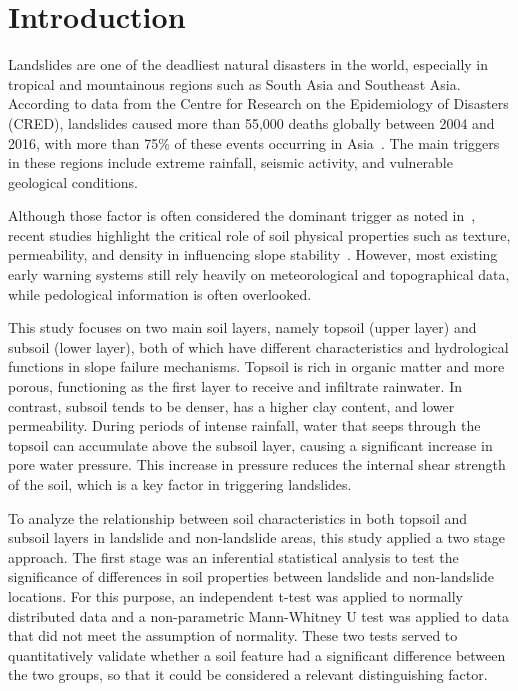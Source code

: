\section{Introduction}

Landslides are one of the deadliest natural disasters in the world, especially in tropical and mountainous regions such as South Asia and Southeast Asia. According to data from the Centre for Research on the Epidemiology of Disasters (CRED), landslides caused more than 55,000 deaths globally between 2004 and 2016, with more than 75\% of these events occurring in Asia~\cite{intro01}. 
The main triggers in these regions include extreme rainfall, seismic activity, and vulnerable geological conditions. 

Although those factor is often considered the dominant trigger as noted in~\cite{intro02}, recent studies highlight the critical role of soil physical properties such as texture, permeability, and density in influencing slope stability~\cite{intro03}. 
However, most existing early warning systems still rely heavily on meteorological and topographical data, while pedological information is often overlooked.

This study focuses on two main soil layers, namely topsoil (upper layer) and subsoil (lower layer), both of which have different characteristics and hydrological functions in slope failure mechanisms. Topsoil is rich in organic matter and more porous, functioning as the first layer to receive and infiltrate rainwater. In contrast, subsoil tends to be denser, has a higher clay content, and lower permeability. 
During periods of intense rainfall, water that seeps through the topsoil can accumulate above the subsoil layer, causing a significant increase in pore water pressure. This increase in pressure reduces the internal shear strength of the soil, which is a key factor in triggering landslides.

To analyze the relationship between soil characteristics in both topsoil and subsoil layers in landslide and non-landslide areas, this study applied a two stage approach. The first stage was an inferential statistical analysis to test the significance of differences in soil properties between landslide and non-landslide locations. 
For this purpose, an independent t-test was applied to normally distributed data and a non-parametric Mann-Whitney U test was applied to data that did not meet the assumption of normality. These two tests served to quantitatively validate whether a soil feature had a significant difference between the two groups, so that it could be considered a relevant distinguishing factor. 

